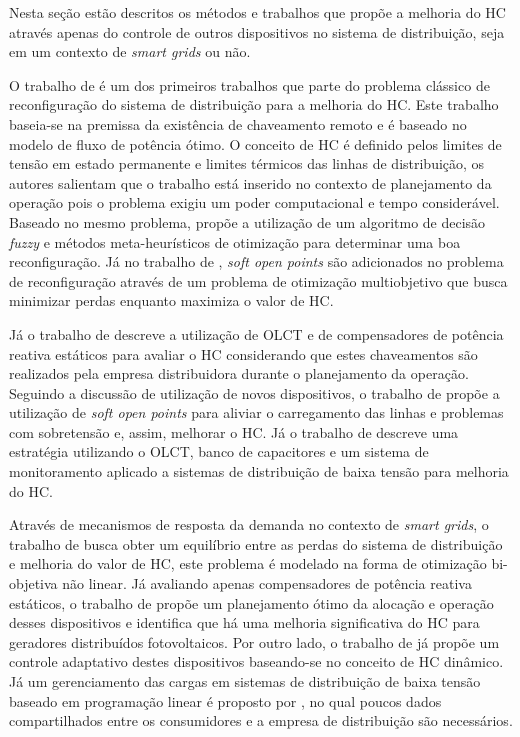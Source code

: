 Nesta seção estão descritos os métodos e trabalhos que propõe a melhoria do HC através apenas do controle de outros dispositivos no sistema de distribuição, seja em um contexto de \textit{smart grids} ou não.


O trabalho de  é um dos primeiros trabalhos que parte do problema clássico de reconfiguração do sistema de distribuição para a melhoria do HC. Este trabalho baseia-se na premissa da existência de chaveamento remoto e é baseado no modelo de fluxo de potência ótimo. O conceito de HC é definido pelos limites de tensão em estado permanente e limites térmicos das linhas de distribuição, os autores salientam que o trabalho está inserido no contexto de planejamento da operação pois o problema exigiu um poder computacional e tempo considerável. Baseado no mesmo problema,  propõe a utilização de um algoritmo de decisão \textit{fuzzy} e métodos meta-heurísticos de otimização para determinar uma boa reconfiguração. Já no trabalho de , \textit{soft open points} são adicionados no problema de reconfiguração através de um problema de otimização multiobjetivo que busca minimizar perdas enquanto maximiza o valor de HC.

Já o trabalho de  descreve a utilização de \ac{OLCT} e de compensadores de potência reativa estáticos para avaliar o HC considerando que estes chaveamentos são realizados pela empresa distribuidora durante o planejamento da operação. Seguindo a discussão de utilização de novos dispositivos, o trabalho de  propõe a utilização de \textit{soft open points} para aliviar o carregamento das linhas e problemas com sobretensão e, assim, melhorar o HC. Já o trabalho de  descreve uma estratégia utilizando o \ac{OLCT}, banco de capacitores e um sistema de monitoramento aplicado a sistemas de distribuição de baixa tensão para melhoria do HC. 


Através de mecanismos de resposta da demanda no contexto de \textit{smart grids}, o trabalho de  busca obter um equilíbrio entre as perdas do sistema de distribuição e melhoria do valor de HC, este problema é modelado na forma de otimização bi-objetiva não linear. Já avaliando apenas compensadores de potência reativa estáticos, o trabalho de  propõe um planejamento ótimo da alocação e operação desses dispositivos e identifica que há uma melhoria significativa do HC para geradores distribuídos fotovoltaicos. Por outro lado, o trabalho de  já propõe um controle adaptativo destes dispositivos baseando-se no conceito de HC dinâmico. Já um gerenciamento das cargas em sistemas de distribuição de baixa tensão baseado em programação linear é proposto por , no qual poucos dados compartilhados entre os consumidores e a empresa de distribuição são necessários.

